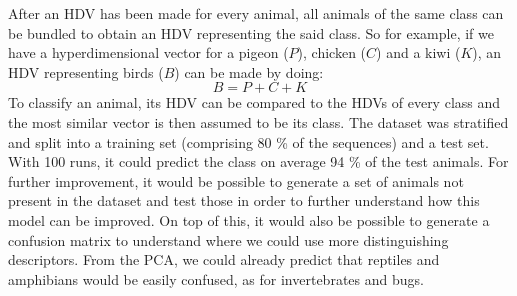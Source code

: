 After an HDV has been made for every animal, all animals of the same class can be bundled to obtain an HDV representing the said class. So for example, if we have a hyperdimensional vector for a pigeon ($P$), chicken ($C$) and a kiwi ($K$), an HDV representing birds ($B$) can be made by doing:
\begin{equation}
    B = P + C + K
\end{equation} 
To classify an animal, its HDV can be compared to the HDVs of every class and the most similar vector is then assumed to be its class. The dataset was stratified and split into a training set (comprising 80 \% of the sequences) and a test set. With 100 runs, it could predict the class on average 94 \% of the test animals. For further improvement, it would be possible to generate a set of animals not present in the dataset and test those in order to further understand how this model can be improved. On top of this, it would also be possible to generate a confusion matrix to understand where we could use more distinguishing descriptors. From the PCA, we could already predict that reptiles and amphibians would be easily confused, as for invertebrates and bugs.
